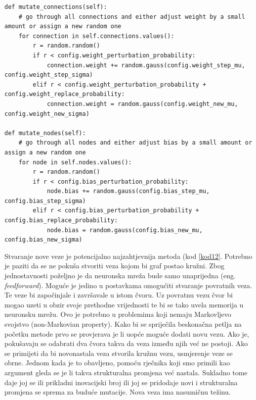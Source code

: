 \documentclass[times, utf8, diplomski, numeric]{fer}
\begin{document}
\begin{lstlisting}[frame=single, label=kod11, caption=Izvorni tekst metodi \textit{mutate\_connections} i \textit{mutate\_nodes} u klasi \textit{Individual}]
def mutate_connections(self):
	# go through all connections and either adjust weight by a small amount or assign a new random one
	for connection in self.connections.values():
		r = random.random()
		if r < config.weight_perturbation_probability:
			connection.weight += random.gauss(config.weight_step_mu, config.weight_step_sigma)
		elif r < config.weight_perturbation_probability + config.weight_replace_probability:
			connection.weight = random.gauss(config.weight_new_mu, config.weight_new_sigma)

def mutate_nodes(self):
	# go through all nodes and either adjust bias by a small amount or assign a new random one
	for node in self.nodes.values():
		r = random.random()
		if r < config.bias_perturbation_probability:
			node.bias += random.gauss(config.bias_step_mu, config.bias_step_sigma)
		elif r < config.bias_perturbation_probability + config.bias_replace_probability:
			node.bias = random.gauss(config.bias_new_mu, config.bias_new_sigma)
\end{lstlisting}

Stvaranje nove veze je potencijalno najzahtjevnija metoda (kod \ref{kod12}. Potrebno je paziti da se ne pokuša stvoriti veza kojom bi graf postao kružni. Zbog jednostavnosti poželjno je da neuronska mreža bude samo unaprijedna (eng. \textit{feedforward}). Moguće je jedino u postavkama omogućiti stvaranje povratnih veza. Te veze bi započinjale i završavale u istom čvoru. Uz povratnu vezu čvor bi mogao uzeti u obzir svoje prethodne vrijednosti te bi se tako uvela memorija u neuronsku mrežu. Ovo je potrebno u problemima koji nemaju Markovljevo svojstvo (non-Markovian property). Kako bi se spriječila beskonačna petlja na početku metode prvo se provjerava je li uopće moguće dodati novu vezu. Ako je, pokušavaju se odabrati dva čvora takva da veza između njih već ne postoji. Ako se primijeti da bi novonastala veza stvorila kružnu vezu, usmjerenje veze se obrne. Jednom kada je to obavljeno, pomoću rječnika koji smo primili kao argument gleda se je li takva strukturalna promjena već nastala. Sukladno tome daje joj se ili prikladni inovacijski broj ili joj se pridodaje novi i strukturalna promjena se sprema za buduće mutacije. Nova veza ima nasumičnu težinu.
\end{document}
